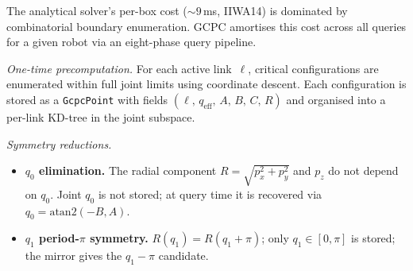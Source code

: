 \documentclass[journal]{IEEEtran}
\begin{document}
The analytical solver's per-box cost ($\sim\!9$\,ms, IIWA14)
is dominated by combinatorial boundary enumeration.
GCPC amortises this cost across all queries for a given robot
via an eight-phase query pipeline.

\emph{One-time precomputation.}
For each active link~$\ell$, critical configurations are
enumerated within full joint limits using coordinate descent.
Each configuration is stored as a \texttt{GcpcPoint} with fields
$(\ell,\, q_\text{eff},\, A,\, B,\, C,\, R)$ and
organised into a per-link KD-tree in the joint subspace.

\emph{Symmetry reductions.}
\begin{itemize}
  \item \textbf{$q_0$ elimination.}
    The radial component $R = \sqrt{p_x^2 + p_y^2}$ and $p_z$ do
    not depend on $q_0$.
    Joint $q_0$ is not stored; at query time it is recovered via
    $q_0 = \mathrm{atan2}(-B, A)$.
  \item \textbf{$q_1$ period-$\pi$ symmetry.}
    $R(q_1) = R(q_1 + \pi)$; only $q_1 \in [0,\pi]$ is stored;
    the mirror gives the $q_1 - \pi$ candidate.
\end{itemize}
\end{document}
